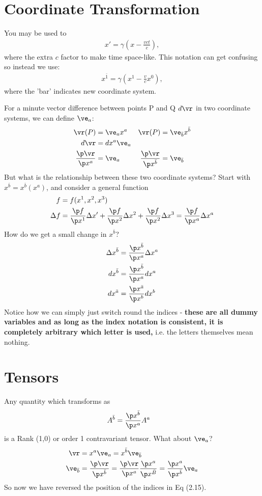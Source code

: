 \documentclass[a4paper, 11pt, normalem]{report}
\begin{document}
\section{Coordinate Transformation}
You may be used to
\begin{align}
    x' = \gamma\left(x-\frac{vct}{c}\right),
\end{align}
where the extra $c$ factor to make time space-like.
This notation can get confusing so instead we use:
\begin{align}
    x^{\bar{1}} = \gamma\left(x^1-\frac{v}{c}x^0\right),
\end{align}
where the 'bar' indicates new coordinate system.

For a minute vector difference between points P and Q $d\vr$ in two coordinate systems, we can define $\ve_a$:
\begin{align}
    \vr(P) &= \ve_ax^a & \vr(P) &= \ve_{\bar{b}}x^{\bar{b}} \\
    d\vr &= dx^a\ve_a  \\
    \frac{\p\vr}{\p x^a} &= \ve_a & \frac{\p\vr}{\p x^{\bar{b}}} &= \ve_{\bar{b}}
\end{align}
But what is the relationship between these two coordinate systems?
Start with $x^{\bar{b}}=x^{\bar{b}}(x^a)$, and consider a general function
\begin{align}
    f &= f(x^1,x^2,x^3) \\
    \Delta f &= \frac{\p f}{\p x^1}\Delta x' + \frac{\p f}{\p x^2}\Delta x^2 + \frac{\p f}{\p x^2}\Delta x^3 = \frac{\p f}{\p x^a}\Delta x^a
\end{align}
How do we get a small change in $x^{\bar{b}}$?
\begin{align}
    \Delta x^{\bar{b}} &= \frac{\p x^{\bar{b}}}{\p x^{a}}\Delta x^{a} \\
    dx^{\bar{b}} &= \frac{\p x^{\bar{b}}}{\p x^a}dx^a \\
    dx^{\bar{a}} &= \frac{\p x^{\bar{a}}}{\p x^b}dx^b
\end{align}
Notice how we can simply just switch round the indices - \textbf{these are all dummy variables and as long as the index notation is consistent, it is completely arbitrary which letter is used,} i.e. the letters themselves mean nothing.

\section{Tensors}
Any quantity which transforms as
\begin{align}
    A^{\bar{b}} &= \frac{\p x^{\bar{b}}}{\p x^a}A^a
\end{align}
is a Rank (1,0) or order 1 contravariant tensor.
What about $\ve_a$?
\begin{align}
    \vr &= x^a\ve_a = x^{\bar{b}}\ve_{\bar{b}} \\
    \ve_{\bar{b}} &= \frac{\p\vr}{\p x^{\bar{b}}} = \frac{\p\vr}{\p x^a} \frac{\p x^a}{\p x^{\bar{B}}} = \frac{\p x^a}{\p x^{\bar{b}}}\ve_a
\end{align}
So now we have reversed the position of the indices in Eq (2.15).
\end{document}
